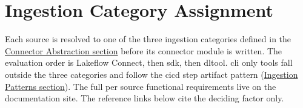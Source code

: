 \section{Ingestion Category Assignment}
\label{sec:ingestion-category-assignment}

Each source is resolved to one of the three ingestion categories defined in the \hyperref[sec:connector-abstraction]{Connector Abstraction section} before its connector module is written. The evaluation order is Lakeflow Connect, then \gls{sdk}, then \gls{dltool}. \Gls{cli} only tools fall outside the three categories and follow the \gls{cicd} step artifact pattern (\hyperref[sec:ingestion-patterns]{Ingestion Patterns section}). The full per source functional requirements live on the documentation site. The reference links below cite the deciding factor only.


